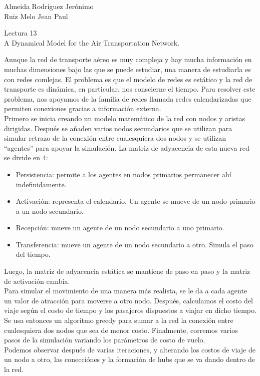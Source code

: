 \documentclass[a4paper, 11pt]{report}
\begin{document}
\begin{flushright}
    Almeida Rodríguez Jerónimo\\
    Ruiz Melo Jean Paul
\end{flushright}

\begin{center}
    {\LARGE Lectura 13}\\
    {\LARGE A Dynamical Model for the Air Transportation Network.}
\end{center}

Aunque la red de transporte aéreo es muy compleja y hay mucha información en
muchas dimensiones bajo las que se puede estudiar, una manera de estudiarla es
con redes comlejas. El problema es que el modelo de redes es estático y la red
de transporte es dinámica, en particular, nos conscierne el tiempo. Para
resolver este problema, nos apoyamos de la familia de redes llamada redes
calendarizadas que permiten conexiones gracias a información externa.\\

Primero se inicia creando un modelo matemático de la red con nodos y aristas
dirigidas. Después se añaden varios nodos secundarios que se utilizan para
simular retrazo de la conexión entre cualesquiera dos nodos y se utilizan
``agentes'' para apoyar la simulación. La matriz de adyacencia de esta nueva red
se divide en 4:
\begin{itemize}
    \item{Persistencia: permite a los agentes en nodos primarios permanecer ahí
        indefinidamente.}
    \item{Activación: representa el calendario. Un agente se mueve de un nodo
        primario a un nodo secundario.}
    \item{Recepción: mueve un agente de un nodo secundario a uno primario.}
    \item{Transferencia: mueve un agente de un nodo secundario a otro. Simula
        el paso del tiempo.}
\end{itemize}
Luego, la matriz de adyacencia estática se mantiene de paso en paso y la matriz
de activación cambia.\\

Para simular el movimiento de una manera más realista, se le da a cada agente un
valor de atracción para moverse a otro nodo. Después, calculamos el costo del
viaje según el costo de tiempo y los pasajeros dispuestos a viajar en dicho
tiempo. Se usa entonces un algoritmo greedy para sumar a la red la conexión
entre cualesquiera dos nodos que sea de menor costo. Finalmente, corremos varios
pasos de la simulación variando los parámetros de costo de vuelo.\\

Podemos observar después de varias iteraciones, y alterando los costos de viaje
de un nodo a otro, las conecciónes y la formación de hubs que se va dando dentro
de la red.
\end{document}
